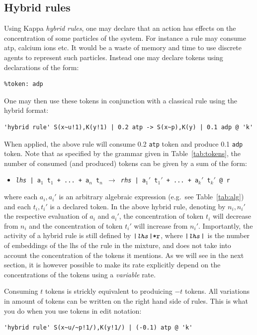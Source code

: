 \documentclass[11pt]{book}
\def\ttt#1{\texttt{#1}}
\def\rar{\rightarrow}
\def\eg{e.g.~}
\def\ITE#1{\begin{itemize}#1\end{itemize}}
\def\imp#1{\emph{#1}\index{#1}}
\begin{document}
\subsection{Hybrid rules}\label{sec:hybrid}

Using Kappa \imp{hybrid rules}, one may declare that an action has
effects on the concentration of some particles of the system. For
instance a rule may consume atp, calcium ions etc. It would be a waste
of memory and time to use discrete agents to represent such
particles. Instead one may declare tokens using
declarations of the form:
\begin{lstlisting}[language=kappa]
%token: atp
%token: adp
\end{lstlisting}
One may then use these tokens in conjunction with a classical rule
using the hybrid format:
\begin{lstlisting}[language=kappa]
'hybrid rule' S(x~u!1),K(y!1) | 0.2 atp -> S(x~p),K(y) | 0.1 adp @ 'k'
\end{lstlisting}
When applied, the above rule will consume 0.2 \ttt{atp} token and
produce 0.1 \ttt{adp} token. Note that as specified by the grammar
given in Table~\ref{tab:tokens}, the number of consumed (and produced)
tokens can be given by a sum of the form: \ITE{
\item[] \ttt{\textit{lhs} | a$_1$ t$_1$ + ... + a$_n$ t$_n$ $\rar$
  \textit{rhs} | a$_1'$ t$_1'$ + ... + a$_k'$ t$_k'$ @ r} } where each
$a_i,a_i'$ is an arbitrary algebraic expression ({\eg}see Table~\ref{tab:alg}) and each $t_i,t_i'$ is a
declared token. In the above hybrid rule, denoting by  $n_i,n_i'$ the
respective evaluation of $a_i$ and $a_i'$, the concentration of token $t_i$ will
decrease from $n_i$ and the concentration of token $t_i'$ will
increase from $n_i'$. Importantly, the activity of a
hybrid rule is still defined by
$\ttt{|\textit{lhs}|*r}$, where $\ttt{|\textit{lhs}|}$ is the number
of embeddings of the lhs of the rule in the mixture, and does not take
into account the concentration of the tokens it mentions. As we will
see in the next section, it is however possible to make its rate
explicitly depend on the concentrations of the tokens using a
\imp{variable} rate.

Consuming $t$ tokens is strickly equivalent to produicing $-t$
tokens. All variations in amount of tokens can be written on the
right hand side of rules. This is what you do when you use tokens in
edit notation:
\begin{lstlisting}[language=kappa]
'hybrid rule' S(x~u/~p!1/),K(y!1/) | (-0.1) atp @ 'k'
\end{lstlisting}
\end{document}
